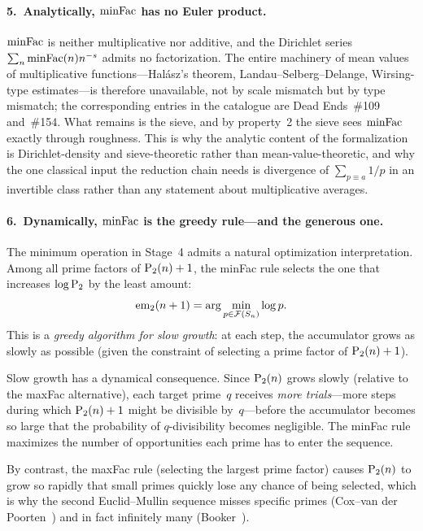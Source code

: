 \paragraph{5.\ Analytically, $\mathrm{minFac}$ has no Euler product.}
$\mathrm{minFac}$ is neither multiplicative nor additive, and the Dirichlet
series $\sum_n \mathrm{minFac}(n) n^{-s}$ admits no factorization.  The entire
machinery of mean values of multiplicative functions---Hal\'asz's
theorem, Landau--Selberg--Delange, Wirsing-type estimates---is therefore
unavailable, not by scale mismatch but by type mismatch; the
corresponding entries in the catalogue are Dead Ends~\#109 and~\#154.
What remains is the sieve, and by property~2 the sieve sees $\mathrm{minFac}$
exactly through roughness.  This is why the analytic content of the
formalization is Dirichlet-density and sieve-theoretic rather than
mean-value-theoretic, and why the one classical input the reduction
chain needs is divergence of $\sum_{p \equiv a} 1/p$ in an invertible
class rather than any statement about multiplicative averages.

\paragraph{6.\ Dynamically, $\mathrm{minFac}$ is the greedy rule---and the
generous one.}
The minimum operation in Stage~4 admits a natural optimization
interpretation.  Among all prime factors of $\mathrm{P}_{2}(n)+1$, the minFac
rule selects the one that increases $\log \mathrm{P}_{2}$ by the least amount:
\[
\mathrm{em}_{2}(n+1) = \arg\min_{p \in \mathcal{F}(S_n)} \log p.
\]
This is a \emph{greedy algorithm for slow growth}: at each step, the
accumulator grows as slowly as possible (given the constraint of
selecting a prime factor of $\mathrm{P}_{2}(n)+1$).

Slow growth has a dynamical consequence.  Since $\mathrm{P}_{2}(n)$ grows slowly
(relative to the maxFac alternative), each target prime~$q$ receives
\emph{more trials}---more steps during which $\mathrm{P}_{2}(n)+1$ might be
divisible by~$q$---before the accumulator becomes so large that the
probability of $q$-divisibility becomes negligible.  The minFac rule
maximizes the number of opportunities each prime has to enter the
sequence.

By contrast, the maxFac rule (selecting the largest prime factor) causes
$\mathrm{P}_{2}(n)$ to grow so rapidly that small primes quickly lose any chance
of being selected, which is why the second Euclid--Mullin sequence
misses specific primes (Cox--van der Poorten~\cite{CoxVdP1968}) and in
fact infinitely many (Booker~\cite{Booker2012}).

